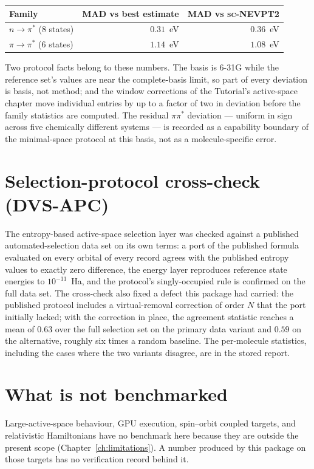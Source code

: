 \begin{center}
\begin{tabular}{lrr}
\toprule
Family & MAD vs best estimate & MAD vs \textsc{sc}-NEVPT2 \\
\midrule
$n \to \pi^*$ (8 states) & $0.31$~eV & $0.36$~eV \\
$\pi \to \pi^*$ (6 states) & $1.14$~eV & $1.08$~eV \\
\bottomrule
\end{tabular}
\end{center}

Two protocol facts belong to these numbers.  The basis is 6-31G while
the reference set's values are near the complete-basis limit, so part
of every deviation is basis, not method; and the window corrections
of the Tutorial's active-space chapter move individual entries by up
to a factor of two in deviation before the family statistics are
computed.  The residual $\pi\pi^*$ deviation --- uniform in sign
across five chemically different systems --- is recorded as a
capability boundary of the minimal-space protocol at this basis, not
as a molecule-specific error.

\section{Selection-protocol cross-check (DVS-APC)}

The entropy-based active-space selection layer was checked against a
published automated-selection data set on its own terms: a port of
the published formula evaluated on every orbital of every record
agrees with the published entropy values to exactly zero difference,
the energy layer reproduces reference state energies to
$10^{-11}$~Ha, and the protocol's singly-occupied rule is confirmed
on the full data set.  The cross-check also fixed a defect this
package had carried: the published protocol includes a
virtual-removal correction of order $N$ that the port initially
lacked; with the correction in place, the agreement statistic reaches
a mean of $0.63$ over the full selection set on the primary data
variant and $0.59$ on the alternative, roughly six times a random
baseline.  The per-molecule statistics, including the cases where the
two variants disagree, are in the stored report.

\section{What is not benchmarked}

Large-active-space behaviour, GPU execution, spin--orbit coupled
targets, and relativistic Hamiltonians have no benchmark here because
they are outside the present scope
(Chapter~\ref{ch:limitations}).  A number produced by this package on
those targets has no verification record behind it.

